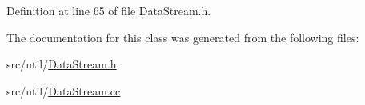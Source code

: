 Definition at line 65 of file Data\+Stream.\+h.



The documentation for this class was generated from the following files\+:\begin{DoxyCompactItemize}
\item 
src/util/\hyperlink{DataStream_8h}{Data\+Stream.\+h}\item 
src/util/\hyperlink{DataStream_8cc}{Data\+Stream.\+cc}\end{DoxyCompactItemize}
